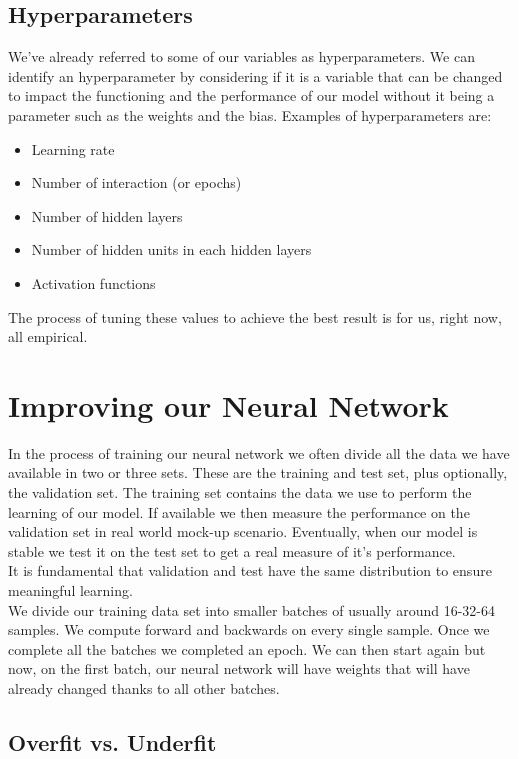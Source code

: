 \documentclass{article}
\begin{document}
\subsection*{Hyperparameters}
We've already referred to some of our variables as hyperparameters. We can identify an hyperparameter by considering if it is a variable that can be changed to impact the functioning and the performance of our model without it being a parameter such as the weights and the bias. Examples of hyperparameters are:
\begin{itemize}
    \item Learning rate
    \item Number of interaction (or epochs)
    \item Number of hidden layers
    \item Number of hidden units in each hidden layers
    \item Activation functions
\end{itemize}
The process of tuning these values to achieve the best result is for us, right now, all empirical.

\section*{Improving our Neural Network}
In the process of training our neural network we often divide all the data we have available in two or three sets. These are the training and test set, plus optionally, the validation set. The training set contains the data we use to perform the learning of our model. If available we then measure the performance on the validation set in real world mock-up scenario. Eventually, when our model is stable we test it on the test set to get a real measure of it's performance.\\
It is fundamental that validation and test have the same distribution to ensure meaningful learning.\\
We divide our training data set into smaller batches of usually around 16-32-64 samples. We compute forward and backwards on every single sample. Once we complete all the batches we completed an epoch. We can then start again but now, on the first batch, our neural network will have weights that will have already changed thanks to all other batches.

\subsection*{Overfit vs. Underfit}
\end{document}
